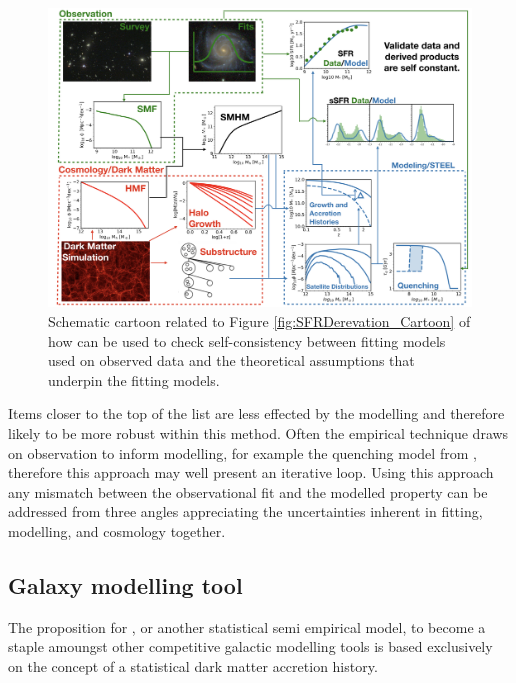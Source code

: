 \begin{figure}[t]
    \centering
    \includegraphics[width = \linewidth]{Figures/Chapter6/FullModelCartoon.png}
    \caption{Schematic cartoon related to Figure \ref{fig:SFRDerevation_Cartoon} of how \steel can be used to check self-consistency between fitting models used on observed data and the theoretical assumptions that underpin the fitting models.}
    \label{fig:Full_Mod_Toon}
\end{figure}
Items closer to the top of the list are less effected by the modelling and therefore likely to be more robust within this method. Often the empirical technique draws on observation to inform modelling, for example the quenching model from \citet{Wetzel2013GalaxyUniverse}, therefore this approach may well present an iterative loop. Using this approach any mismatch between the observational fit and the modelled property can be addressed from three angles appreciating the uncertainties inherent in fitting, modelling, and cosmology together.

\subsection{Galaxy modelling tool}

The proposition for \steel, or another statistical semi empirical model, to become a staple amoungst other competitive galactic modelling tools is based exclusively on the concept of a statistical dark matter accretion history. 

